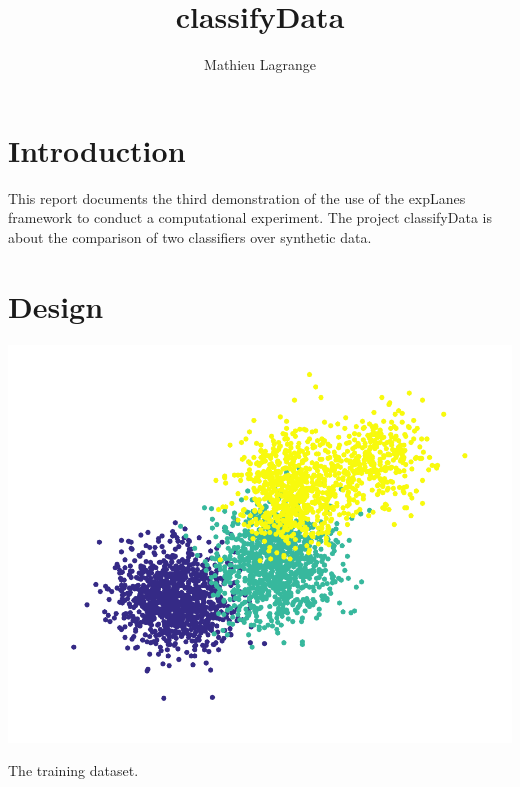 \documentclass[12pt,a4paper,fleqn]{tufte-handout}
\title{classifyData}
\author{ Mathieu Lagrange }
\begin{document}
 
  
\maketitle 
  
  
\section{Introduction}

This report documents the third demonstration of the use of the expLanes framework to conduct a computational experiment. The project classifyData is about the comparison of two classifiers over synthetic data.

\section{Design}

\begin{marginfigure}
\includegraphics[width=\textwidth]{figures/scatter1}
\caption{The training dataset.}
\label{scatter}
\end{marginfigure}
\end{document}
